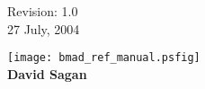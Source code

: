 \thispagestyle{empty}

\begin{flushright}
\large
  Revision: 1.0 \\
  27 July, 2004 \\
\end{flushright}

\vfill

{
\begin{center}
\texttt{[image: bmad\_ref\_manual.psfig]} \\
\vskip 0.3in
\huge\bf David Sagan
\end{center}
}


\vfill
\break